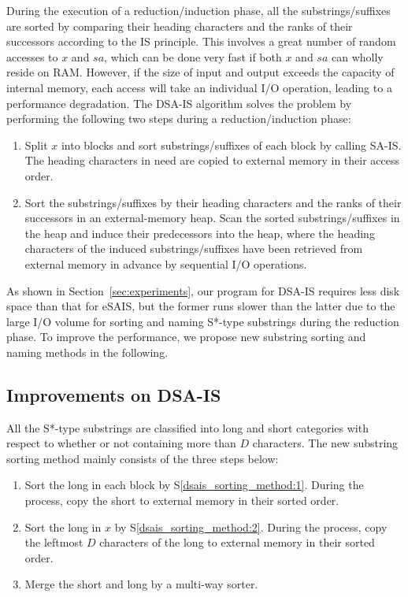 \documentclass[10pt,journal,compsoc]{IEEEtran}
\begin{document}
During the execution of a reduction/induction phase, all the substrings/suffixes are sorted by comparing their heading characters and the ranks of their successors according to the IS principle. This involves a great number of random accesses to $x$ and $sa$, which can be done very fast if both $x$ and $sa$ can wholly reside on RAM. However, if the size of input and output exceeds the capacity of internal memory, each access will take an individual I/O operation, leading to a performance degradation. The DSA-IS algorithm solves the problem by performing the following two steps during a reduction/induction phase:

\begin{enumerate}[S1]
	
	\item Split $x$ into blocks and sort substrings/suffixes of each block by calling SA-IS. The heading characters in need are copied to external memory in their access order. \label{dsais_sorting_method:1}
	
	\item Sort the substrings/suffixes by their heading characters and the ranks of their successors in an external-memory heap. Scan the sorted substrings/suffixes in the heap and induce their predecessors into the heap, where the heading characters of the induced substrings/suffixes have been retrieved from external memory in advance by sequential I/O operations. \label{dsais_sorting_method:2}
\end{enumerate}

As shown in Section~\ref{sec:experiments}, our program for DSA-IS requires less disk space than that for eSAIS, but the former runs slower than the latter due to the large I/O volume for sorting and naming S*-type substrings during the reduction phase. To improve the performance, we propose new substring sorting and naming methods in the following.

\subsection{Improvements on DSA-IS}

All the S*-type substrings are classified into long and short categories with respect to whether or not containing more than $D$ characters. The new substring sorting method mainly consists of the three steps below:

\begin{enumerate}[S1']
	\item Sort the long in each block by S\ref{dsais_sorting_method:1}. During the process, copy the short to external memory in their sorted order.~\label{dsaism_sorting_method:1}
	
	\item Sort the long in $x$ by S\ref{dsais_sorting_method:2}. During the process, copy the leftmost $D$ characters of the long to external memory in their sorted order.~\label{dsaism_sorting_method:2}
	
	\item Merge the short and long by a multi-way sorter.~\label{dsaism_sorting_method:3}
\end{enumerate}
\end{document}

